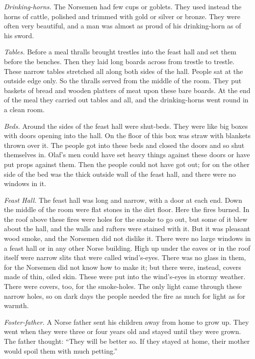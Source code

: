 \label{drinking-horns}
\noindent\emph{Drinking-horns.} The Norsemen had few cups or goblets.
They used instead the horns of cattle, polished and trimmed with gold or
silver or bronze. They were often very beautiful, and a man was almost as
proud of his drinking-horn as of his sword.

\label{tables}
\noindent\emph{Tables.} Before a meal thralls brought trestles into the
feast hall and set them before the benches. Then they laid long boards
across from trestle to trestle. These narrow tables stretched all along
both sides of the hall. People sat at the outside edge only. So the
thralls served from the middle of the room. They put baskets of bread and
wooden platters of meat upon these bare boards. At the end of the meal
they carried out tables and all, and the drinking-horns went round in a
clean room.

\label{beds}
\noindent\emph{Beds.} Around the sides of the feast hall were shut-beds.
They were like big boxes with doors opening into the hall. On the floor
of this box was straw with blankets thrown over it. The people got into
these beds and closed the doors and so shut themselves in. Olaf's men
could have set heavy things against these doors or have put props
against them. Then the people could not have got out; for on the other
side of the bed was the thick outside wall of the feast hall, and there
were no windows in it.

\label{feast-hall}
\noindent\emph{Feast Hall.} The feast hall was long and narrow, with a
door at each end. Down the middle of the room were flat stones in the
dirt floor. Here the fires burned. In the roof above these fires were
holes for the smoke to go out, but some of it blew about the hall, and
the walls and rafters were stained with it. But it was pleasant wood
smoke, and the Norsemen did not dislike it. There were no large windows
in a feast hall or in any other Norse building. High up under the eaves
or in the roof itself were narrow slits that were called wind's-eyes.
There was no glass in them, for the Norsemen did not know how to make it;
but there were, instead, covers made of thin, oiled skin. These were put
into the wind's-eyes in stormy weather. There were covers, too, for the
smoke-holes. The only light came through these narrow holes, so on dark
days the people needed the fire as much for light as for warmth.

\label{foster-father}
\noindent\emph{Foster-father.} A Norse father sent his children away from
home to grow up. They went when they were three or four years old and
stayed until they were grown. The father thought: ``They will be better
so. If they stayed at home, their mother would spoil them with much
petting.''

